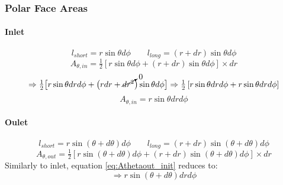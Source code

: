 \documentclass[12pt, letterpaper, twoside]{article}
\begin{document}
        \subsubsection{Polar Face Areas}
        \paragraph{Inlet}
            \begin{equation*}
                l_{short} = r\sin\theta d\phi \qquad
                l_{long} = (r + dr)\sin\theta d\phi 
            \end{equation*}
            \begin{equation}\label{eq:Athetain_init}
                A_{\theta,in} = \tfrac{1}{2} \left[r\sin\theta d\phi +  (r + dr)\sin\theta d\phi\right] \times dr
            \end{equation}
            \begin{equation*}
                \Rightarrow
                \tfrac{1}{2} \big[r\sin\theta dr d\phi +  \big(rdr + \cancelto{0}{dr^2}\big)\sin\theta d\phi\big] 
                \Rightarrow
                \tfrac{1}{2} \left[r\sin\theta dr d\phi + r\sin\theta dr d\phi\right]
            \end{equation*}
            \begin{equation}\label{eq:Athetain_final}
                A_{\theta,in} = r\sin\theta dr d\phi
            \end{equation}

        \paragraph{Oulet}
            \begin{equation*}
                l_{short} = r\sin\left(\theta + d\theta\right) d\phi \qquad
                l_{long} = (r + dr)\sin\left(\theta + d\theta\right) d\phi 
            \end{equation*}
            \begin{equation}\label{eq:Athetaout_init}
                A_{\theta,out} = \tfrac{1}{2} \left[r\sin\left(\theta + d\theta\right) d\phi +  (r + dr)\sin\left(\theta + d\theta\right) d\phi \right] \times dr
            \end{equation}
            Similarly to inlet, equation \ref{eq:Athetaout_init} reduces to:
            \begin{equation*}
                \Rightarrow
                r\sin\left(\theta + d\theta \right) dr d\phi
            \end{equation*}
            
\end{document}
